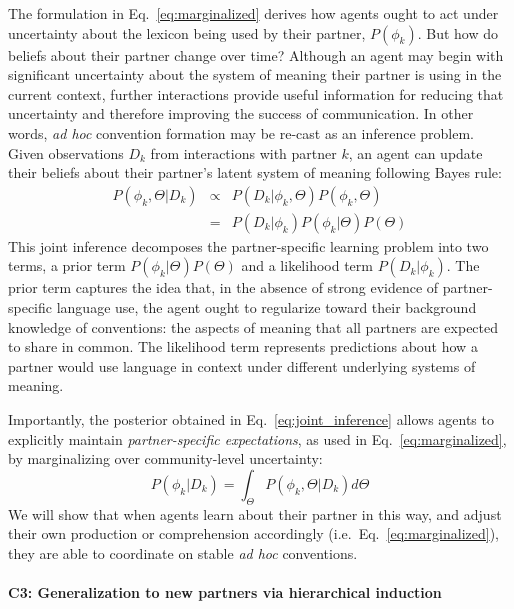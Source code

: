 The formulation in Eq.~\ref{eq:marginalized} derives how agents ought to act under uncertainty about the lexicon being used by their partner, $P(\phi_k)$.
But how do beliefs about their partner change over time?
Although an agent may begin with significant uncertainty about the system of meaning their partner is using in the current context, further interactions provide useful information for reducing that uncertainty and therefore improving the success of communication.
In other words, \emph{ad hoc} convention formation may be re-cast as an inference problem.
Given observations $D_k$ from interactions with partner $k$, an agent can update their beliefs about their partner's latent system of meaning following Bayes rule:
\begin{equation}
\begin{array}{rcl}
\label{eq:joint_inference}
P(\phi_k, \Theta | D_k)  & \propto &  P(D_k | \phi_k, \Theta) P(\phi_k, \Theta) \\
                           & =   & P(D_k | \phi_k) P(\phi_k | \Theta) P(\Theta)
\end{array}
\end{equation}
This joint inference decomposes the partner-specific learning problem into two terms, a prior term $P(\phi_k | \Theta)P(\Theta)$ and a likelihood term $P(D_k | \phi_k)$.
The prior term captures the idea that, in the absence of strong evidence of partner-specific language use, the agent ought to regularize toward their background knowledge of conventions: the aspects of meaning that all partners are expected to share in common.
The likelihood term represents predictions about how a partner would use language in context under different underlying systems of meaning.

Importantly, the posterior obtained in Eq.~\ref{eq:joint_inference} allows agents to explicitly maintain \emph{partner-specific expectations}, as used in Eq.~\ref{eq:marginalized}, by marginalizing over community-level uncertainty:
\begin{equation}
P(\phi_k | D_k) =  \int_{\Theta}P(\phi_k, \Theta | D_k)  d\Theta
\end{equation}
We will show that when agents learn about their partner in this way, and adjust their own production or comprehension accordingly (i.e.~Eq.~\ref{eq:marginalized}), they are able to coordinate on stable \emph{ad hoc} conventions.

\paragraph{C3: Generalization to new partners via hierarchical induction}


